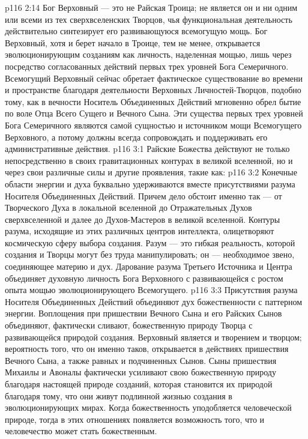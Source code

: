 \vs p116 2:14 Бог Верховный --- это не Райская Троица; не является он и ни одним или всеми из тех сверхвселенских Творцов, чья функциональная деятельность действительно синтезирует его развивающуюся всемогущую мощь. Бог Верховный, хотя и берет начало в Троице, тем не менее, открывается эволюционирующим созданиям как личность, наделенная мощью, лишь через посредство согласованных действий первых трех уровней Бога Семеричного. Всемогущий Верховный сейчас обретает фактическое существование во времени и пространстве благодаря деятельности Верховных Личностей\hyp{}Творцов, подобно тому, как в вечности Носитель Объединенных Действий мгновенно обрел бытие по воле Отца Всего Сущего и Вечного Сына. Эти существа первых трех уровней Бога Семеричного являются самой сущностью и источником мощи Всемогущего Верховного, а потому должны всегда сопровождать и поддерживать его административные действия.
\vs p116 3:1 Райские Божества действуют не только непосредственно в своих гравитационных контурах в великой вселенной, но и через свои различные силы и другие проявления, такие как:
\vs p116 3:2 \bibnobreakspace {} Конечные области энергии и духа буквально удерживаются вместе присутствиями разума Носителя Объединенных Действий. Причем дело обстоит именно так --- от Творческого Духа в локальной вселенной до Отражательных Духов сверхвселенной и далее до Духов\hyp{}Мастеров в великой вселенной. Контуры разума, исходящие из этих различных центров интеллекта, олицетворяют космическую сферу выбора создания. Разум --- это гибкая реальность, которой создания и Творцы могут без труда манипулировать; он --- необходимое звено, соединяющее материю и дух. Дарование разума Третьего Источника и Центра объединяет духовную личность Бога Верховного с развивающейся с ростом опыта мощью эволюционирующего Всемогущего.
\vs p116 3:3 \pc {}\bibnobreakspace {} Присутствия разума Носителя Объединенных Действий объединяют дух божественности с паттерном энергии. Воплощения при пришествии Вечного Сына и его Райских Сынов объединяют, фактически сливают, божественную природу Творца с развивающейся природой создания. Верховный является и творением и творцом; вероятность того, что он именно таков, открывается в действиях пришествия Вечного Сына, а также равных и подчиненных Сынов. Сыны пришествия Михаилы и Авоналы фактически усиливают свою божественную природу благодаря настоящей природе созданий, которая становится их природой благодаря тому, что они живут подлинной жизнью создания в эволюционирующих мирах. Когда божественность уподобляется человеческой природе, тогда в этих отношениях появляется возможность того, что и человечество может стать божественным.
